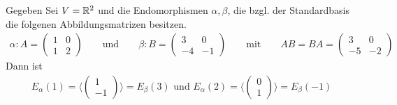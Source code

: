 Gegeben Sei $V=\mathbb{R}^2$ und die Endomorphismen $\alpha,\beta$, die bzgl. der Standardbasis die folgenen Abbildungsmatrizen besitzen.
\begin{align*}
    \alpha:A=\begin{pmatrix}1&0\\1&2\end{pmatrix} \qquad \mbox{und} \qquad \beta:B=\begin{pmatrix}3&0\\-4&-1\end{pmatrix} \qquad \mbox{mit} \qquad AB=BA=\begin{pmatrix}3&0\\-5&-2\end{pmatrix}
\end{align*}
Dann ist 
\begin{align*}
    E_{\alpha}(1) = \langle \begin{pmatrix}1\\-1\end{pmatrix} \rangle = E_{\beta}(3) \mbox{ und }	E_{\alpha}(2) = \langle \begin{pmatrix}0\\ 1\end{pmatrix} \rangle = E_{\beta}(-1)
\end{align*}
